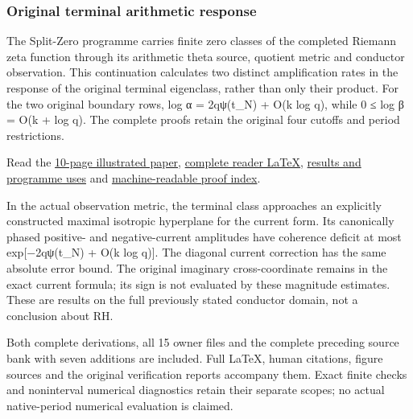 \documentclass[
]{article}
\begin{document}
\subsubsection{Original terminal arithmetic
response}\label{original-terminal-arithmetic-response}

The Split-Zero programme carries finite zero classes of the completed
Riemann zeta function through its arithmetic theta source, quotient
metric and conductor observation. This continuation calculates two
distinct amplification rates in the response of the original terminal
eigenclass, rather than only their product. For the two original
boundary rows, log α = 2qψ(t\_N) + O(k log q), while 0 ≤ log β = O(k +
log q). The complete proofs retain the original four cutoffs and period
restrictions.

Read the
\href{https://github.com/KokunoYumeto/zeta-function-research-reader/blob/main/workbenches/splitzero-tandem/continuations/20260922-terminal-response/TERMINAL_RESPONSE_READER.pdf}{10-page
illustrated paper},
\href{https://github.com/KokunoYumeto/zeta-function-research-reader/blob/main/workbenches/splitzero-tandem/continuations/20260922-terminal-response/TERMINAL_RESPONSE_READER.tex}{complete
reader LaTeX},
\href{https://github.com/KokunoYumeto/zeta-function-research-reader/blob/main/workbenches/splitzero-tandem/continuations/20260922-terminal-response/RESULTS_20260922_027.md}{results
and programme uses} and
\href{https://github.com/KokunoYumeto/zeta-function-research-reader/blob/main/workbenches/splitzero-tandem/continuations/20260922-terminal-response/RESULT_INDEX.json}{machine-readable
proof index}.

In the actual observation metric, the terminal class approaches an
explicitly constructed maximal isotropic hyperplane for the current
form. Its canonically phased positive- and negative-current amplitudes
have coherence deficit at most exp{[}−2qψ(t\_N) + O(k log q){]}. The
diagonal current correction has the same absolute error bound. The
original imaginary cross-coordinate remains in the exact current
formula; its sign is not evaluated by these magnitude estimates. These
are results on the full previously stated conductor domain, not a
conclusion about RH.

Both complete derivations, all 15 owner files and the complete preceding
source bank with seven additions are included. Full LaTeX, human
citations, figure sources and the original verification reports
accompany them. Exact finite checks and noninterval numerical
diagnostics retain their separate scopes; no actual native-period
numerical evaluation is claimed.
\end{document}

